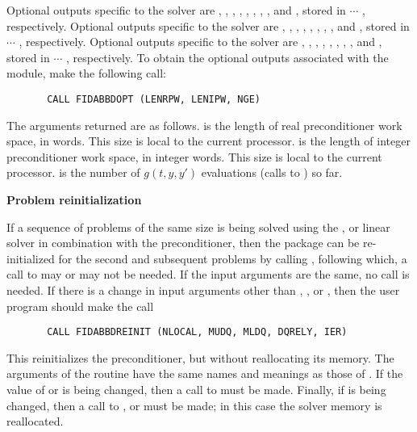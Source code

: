 \begin{Steps}
  Optional outputs specific to the {\spgmr} solver are , , ,
  , , , , , and , stored in
   $\cdots$ , respectively.
  Optional outputs specific to the {\spbcg} solver are , , ,
  , , , , , and , stored in
   $\cdots$ , respectively.
  Optional outputs specific to the {\sptfqmr} solver are , , ,
  , , , , , and , stored in
   $\cdots$ , respectively.
  To obtain the optional outputs associated with the {\idabbdpre} module, make
  the following call:
\begin{verbatim}
       CALL FIDABBDOPT (LENRPW, LENIPW, NGE)
\end{verbatim}
  The arguments returned are as follows.
   is the length of real preconditioner work space, in 
  words.  This size is local to the current processor.
   is the length of integer preconditioner work space, in integer
  words.  This size is local to the current processor.
   is the number of $g(t,y,y')$ evaluations (calls to ) so far.
  
\item {\bf Problem reinitialization}
  
  If a sequence of problems of the same size is being solved using the {\spgmr},
  {\spbcg} or {\sptfqmr} linear solver in combination with the {\idabbdpre}
  preconditioner, then the {\ida} package can be re-initialized for the second
  and subsequent problems by calling , following which, a call
  to  may or  may not be needed.
  If the input arguments are the same, no  call is needed.
  If there is a change in input arguments other than , , or
  , then the user program should make the call 
\begin{verbatim}
       CALL FIDABBDREINIT (NLOCAL, MUDQ, MLDQ, DQRELY, IER)
\end{verbatim}
  This reinitializes the {\idabbdpre} preconditioner, but without
  reallocating its memory.  The arguments of the 
  routine have the same names and meanings as those of .
  If the value of  or  is being changed, then a call to
   must be made.  Finally, if  is being
  changed, then a call to ,  or 
  must be made; in this case the solver memory is reallocated.


\end{Steps}
